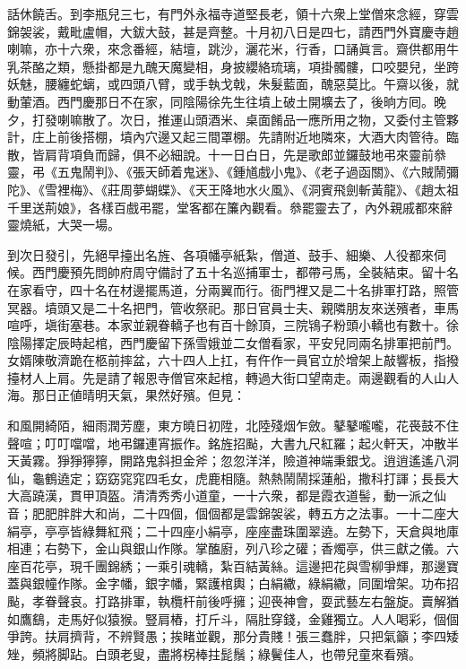 話休饒舌。到李瓶兒三七，有門外永福寺道堅長老，領十六衆上堂僧來念經，穿雲錦袈裟，戴毗盧帽，大鈸大鼓，甚是齊整。{}十月初八日是四七，請西門外寶慶寺趙喇嘛，亦十六衆，來念番經，結壇，跳沙，灑花米，行香，口誦眞言。齋供都用牛乳茶酪之類，懸掛都是九醜天魔變相，身披纓絡琉璃，項掛髑髏，口咬嬰兒，坐跨妖魅，腰纏蛇螭，或四頭八臂，或手執戈戟，朱髮藍面，醜惡莫比。午齋以後，就動葷酒。西門慶那日不在家，同陰陽徐先生往墳上破土開壙去了，後晌方囘。晚夕，打發喇嘛散了。次日，推運山頭酒米、桌面餚品一應所用之物，又委付主管夥計，庄上前後搭棚，墳內穴邊又起三間罩棚。先請附近地隣來，大酒大肉管待。臨散，皆肩背項負而歸，{}俱不必細說。十一日白日，先是歌郎並鑼鼓地弔來靈前叅靈，弔《五鬼鬧判》、《張天師着鬼迷》、《鍾馗戲小鬼》、《老子過函關》、《六賊鬧彌陀》、《雪裡梅》、《莊周夢蝴蝶》、《天王降地水火風》、《洞賓飛劍斬黃龍》、《趙太祖千里送荊娘》，各樣百戲弔罷，堂客都在簾內觀看。叅罷靈去了，內外親戚都來辭靈燒紙，大哭一場。

到次日發引，先絕早擡出名旌、各項幡亭紙紮，僧道、鼓手、細樂、人役都來伺候。西門慶預先問帥府周守備討了五十名巡捕軍士，都帶弓馬，全裝結束。留十名在家看守，四十名在材邊擺馬道，分兩翼而行。衙門裡又是二十名排軍打路，照管冥器。墳頭又是二十名把門，管收祭祀。那日官員士夫、親隣朋友來送殯者，車馬喧呼，塡街塞巷。本家並親眷轎子也有百十餘頂，三院鴇子粉頭小轎也有數十。徐陰陽擇定辰時起棺，西門慶留下孫雪娥並二女僧看家，平安兒同兩名排軍把前門。女婿陳敬濟跪在柩前摔盆，{}六十四人上扛，有仵作一員官立於增架上敲響板，指撥擡材人上肩。先是請了報恩寺僧官來起棺，轉過大街口望南走。兩邊觀看的人山人海。那日正値晴明天氣，果然好殯。但見：

\begin{myquote}
和風開綺陌，細雨潤芳塵，東方曉日初陞，北陸殘烟乍斂。鼕鼕嚨嚨，花䘮鼓不住聲喧；叮叮噹噹，地弔鑼連宵振作。銘旌招颭，大書九尺紅羅；起火軒天，冲散半天黃霧。猙猙獰獰，開路鬼斜担金斧；忽忽洋洋，險道神端秉銀戈。逍逍遙遙八洞仙，龜鶴遶定；窈窈窕窕四毛女，虎鹿相隨。熱熱鬧鬧採蓮船，撒科打諢；長長大大高蹺漢，貫甲頂盔。清清秀秀小道童，一十六衆，都是霞衣道髻，動一派之仙音；肥肥胖胖大和尚，二十四個，個個都是雲錦袈裟，轉五方之法事。一十二座大絹亭，亭亭皆綠舞紅飛；二十四座小絹亭，座座盡珠圍翠遶。左勢下，天倉與地庫相連；右勢下，金山與銀山作隊。掌醢廚，列八珍之礶；香燭亭，供三獻之儀。六座百花亭，現千團錦綉；一乘引魂轎，紮百結黃絲。這邊把花與雪柳爭輝，那邊寶蓋與銀幢作隊。金字幡，銀字幡，緊護棺輿；白絹繖，綠絹繖，同圍增架。功布招颭，孝眷聲哀。打路排軍，執欖杆前後呼擁；迎䘮神會，耍武藝左右盤旋。賣解猶如鷹鷂，走馬好似猿猴。豎肩樁，打斤斗，隔肚穿錢，金雞獨立。人人喝彩，個個爭誇。扶肩擠背，不辨賢愚；挨睹並觀，那分貴賤！張三蠢胖，只把氣籲；李四矮矬，頻將脚跕。白頭老叟，盡將柺棒拄髭鬚；綠鬢佳人，也帶兒童來看殯。
\end{myquote}

